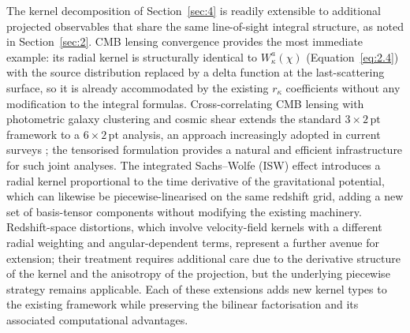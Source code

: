 The kernel decomposition of Section~\ref{sec:4} is readily extensible to additional projected observables that share the same line-of-sight integral structure, as noted in Section~\ref{sec:2}. CMB lensing convergence provides the most immediate example: its radial kernel is structurally identical to \(W_\kappa^a(\chi)\) (Equation~\ref{eq:2.4}) with the source distribution replaced by a delta function at the last-scattering surface, so it is already accommodated by the existing \(r_\kappa\) coefficients without any modification to the integral formulas. Cross-correlating CMB lensing with photometric galaxy clustering and cosmic shear extends the standard \(3\times2\,\mathrm{pt}\) framework to a \(6\times2\,\mathrm{pt}\) analysis, an approach increasingly adopted in current surveys \citep{2025A&A...702A.169S, 2025A&A...699A.127J}; the tensorised formulation provides a natural and efficient infrastructure for such joint analyses. The integrated Sachs--Wolfe (ISW) effect introduces a radial kernel proportional to the time derivative of the gravitational potential, which can likewise be piecewise-linearised on the same redshift grid, adding a new set of basis-tensor components without modifying the existing machinery. Redshift-space distortions, which involve velocity-field kernels with a different radial weighting and angular-dependent terms, represent a further avenue for extension; their treatment requires additional care due to the derivative structure of the kernel and the anisotropy of the projection, but the underlying piecewise strategy remains applicable. Each of these extensions adds new kernel types to the existing framework while preserving the bilinear factorisation and its associated computational advantages.

